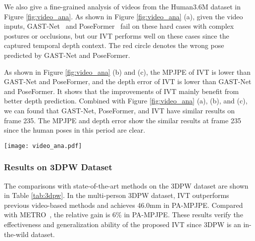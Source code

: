 \documentclass[sigconf]{acmart}
\begin{document}
We also give a fine-grained analysis of videos from the Human3.6M dataset in Figure \ref{fig:video_ana}. 
As shown in Figure \ref{fig:video_ana} (a), given the video inputs, GAST-Net~\cite{liu2021graph} and PoseFormer~\cite{zheng20213d} fail on these hard cases with complex postures or occlusions, but our IVT performs well on these cases since the captured temporal depth context. The red circle denotes the wrong pose predicted by GAST-Net and PoseFormer.

As shown in Figure \ref{fig:video_ana} (b) and (c), the MPJPE of IVT is lower than GAST-Net and PoseFormer, and the depth error of IVT is lower than GAST-Net and PoseFormer. It shows that the improvements of IVT mainly benefit from better depth prediction. Combined with Figure \ref{fig:video_ana} (a), (b), and (c), we can found that GAST-Net, PoseFormer, and IVT have similar results on frame 235. The MPJPE and depth error show the similar results at frame 235 since the human poses in this period are clear.


\begin{figure*}[!t]
\centering
\texttt{[image: video\_ana.pdf]}
\vspace{-0.5cm}
\caption{Qualitative comparison between IVT and the SOTA video methods (GAST-Net~\cite{liu2021graph} and PoseFormer~\cite{zheng20213d}) on video from Human3.6M dataset. (a) visualization results (Red circle denotes the wrong prediction). (b) The curve of MPJPE-Frame shows the MPJPE on each frame. (c) The curve of Depth Error-Frame shows the MPJPE in depth dimension on each frame. The depth prediction by IVT is better than GAST-Net and PoseFormer. Best viewed in color.}
\label{fig:video_ana}
\end{figure*}


\subsubsection{Results on 3DPW Dataset}
The comparisons with state-of-the-art methods on the 3DPW dataset are shown in Table \ref{tab:3dpw}. In the multi-person 3DPW dataset, IVT outperforms previous video-based methods and achieves 46.0mm in PA-MPJPE. Compared with METRO~\cite{lin2021end}, the relative gain is 6\% in PA-MPJPE. These results verify the effectiveness and generalization ability of the proposed IVT since 3DPW is an in-the-wild dataset.
\end{document}
